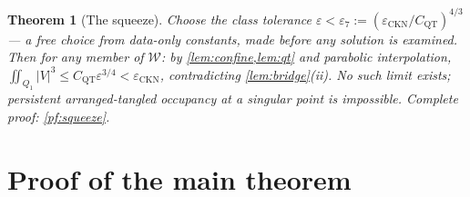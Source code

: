\documentclass[11pt,letterpaper]{amsart}
\newtheorem{theorem}{Theorem}[section]
\theoremstyle{definition}
\theoremstyle{remark}
\newcommand{\abs}[1]{\lvert #1 \rvert}
\begin{document}
\begin{theorem}[The squeeze]\label{thm:squeeze}
Choose the class tolerance $\varepsilon<\varepsilon_7:=
(\varepsilon_{\mathrm{CKN}}/C_{\mathrm{QT}})^{4/3}$ --- a free choice from data-only
constants, made before any solution is examined. Then for any member of
$\mathcal{W}$: by \cref{lem:confine,lem:qt} and parabolic interpolation,
$\iint_{Q_1}\abs{V}^3\le C_{\mathrm{QT}}\varepsilon^{3/4}<\varepsilon_{\mathrm{CKN}}$,
contradicting \cref{lem:bridge}\textup{(ii)}. No such limit exists; persistent
arranged-tangled occupancy at a singular point is impossible. Complete proof: \cref{pf:squeeze}.
\end{theorem}

\section{Proof of the main theorem}\label{sec:mainproof}
\end{document}
